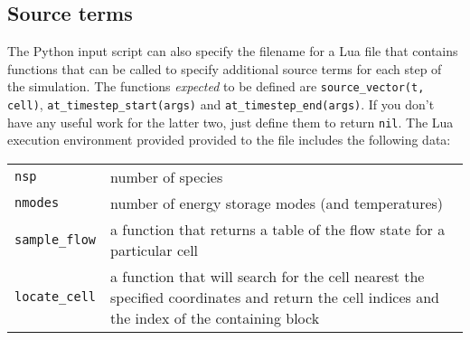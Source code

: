 \subsection{Source terms}
%
The Python input script can also specify the filename for a Lua file that contains functions
that can be called to specify additional source terms for each step of the simulation.
The functions \textit{expected} to be defined are \texttt{source\_vector(t, cell)},
\texttt{at\_timestep\_start(args)} and \texttt{at\_timestep\_end(args)}.
If you don't have any useful work for the latter two, just define them to return \texttt{nil}. 
The Lua execution environment provided provided to the file includes the following data:\\
\begin{tabular}{ll}
 \texttt{nsp} & number of species \\
 \texttt{nmodes} & number of energy storage modes (and temperatures) \\
 \texttt{sample\_flow} & \parbox{12cm}{a function that returns a table of 
                                      the flow state for a particular cell} \\
 \texttt{locate\_cell} & \parbox{12cm}{a function that will search for the cell nearest 
                                      the specified coordinates and return the cell indices
                                      and the index of the containing block} 
\end{tabular}
 
